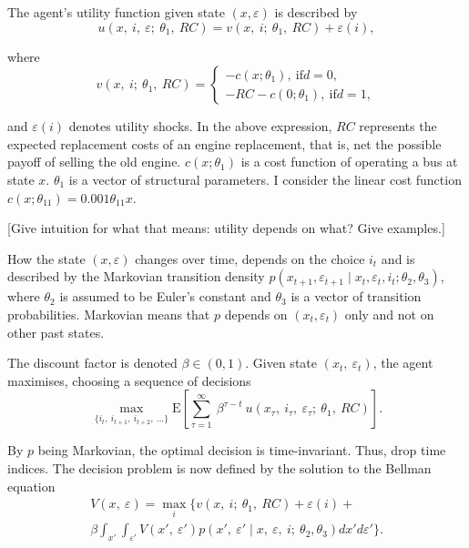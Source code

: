 The agent’s utility function given state $(x, \varepsilon)$ is described by
\begin{equation}
u(x,\ i,\ \varepsilon;\ \theta_1,\ RC)=v(x,\ i;\ \theta_1,\ RC)+\varepsilon(i),
\end{equation}

where
\begin{equation*}
v(x,\ i;\ \theta_1,\ RC)=
\begin{cases}
-c(x; \theta_1),\ \text{if} d=0,\\
-RC-c(0;\theta_1),\ \text{if} d=1,
\end{cases}
\end{equation*}

\noindent and $\varepsilon(i)$ denotes utility shocks. In the above expression, $RC$ represents the expected replacement costs of an engine replacement, that is, net the possible payoff of selling the old engine. $c(x; \theta_1)$ is a cost function of operating a bus at state $x$. $\theta_1$ is a vector of structural parameters. I consider the linear cost function $c(x; \theta_{11}) = 0.001 \theta_{11} x$.

[Give intuition for what that means: utility depends on what? Give examples.]

How the state $(x, \varepsilon)$ changes over time, depends on the choice $i_t$ and is described by the Markovian transition density $p(x_{t+1}, \varepsilon_{t+1} \mid x_t, \varepsilon_t, i_t; \theta_2, \theta_3)$, where $\theta_2$ is assumed to be Euler’s constant and $\theta_3$ is a vector of transition probabilities. Markovian means that $p$ depends on $ (x_t, \varepsilon_t) $ only and not on other past states.

The discount factor is denoted $\beta \in (0,1) $. Given state $ (x_t,\ \varepsilon_t) $, the agent maximises, choosing a sequence of decisions
\begin{equation}
\max_{\{i_t,\ i_{t+1},\ i_{t+2},\ ...\}}  \mathrm{E} \left[\sum_{\tau=1}^\infty\ \beta^{\tau-t}\ u(x_{\tau},\ i_{\tau},\ \varepsilon_{\tau};\ \theta_1,\ RC) \right].
\end{equation}

By $p$ being Markovian, the optimal decision is time-invariant. Thus, drop time indices. The decision problem is now defined by the solution to the Bellman equation
\begin{multline}
V(x,\ \varepsilon)=\max_i \{ v(x,\ i;\ \theta_1,\ RC)+\varepsilon(i) + \\
\beta \int_{x'} \int_{\varepsilon'} V(x',\ \varepsilon')p(x',\ \varepsilon' \mid x,\ \varepsilon,\ i;\ \theta_2, \theta_3)dx' d \varepsilon' \}.
\end{multline}

